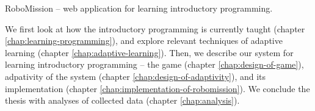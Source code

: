 %
  {RoboMission -- web application for learning introductory programming.}

We first look at how the introductory programming is currently taught
(chapter \ref{chap:learning-programming}),
and explore relevant techniques of adaptive learning (chapter \ref{chap:adaptive-learning}).
Then, we describe our system for learning introductory programming --
the game (chapter \ref{chap:design-of-game}),
adpativity of the system (chapter \ref{chap:design-of-adaptivity}),
and its implementation (chapter \ref{chap:implementation-of-robomission}).
We conclude the thesis with analyses of collected data
(chapter \ref{chap:analysis}).
